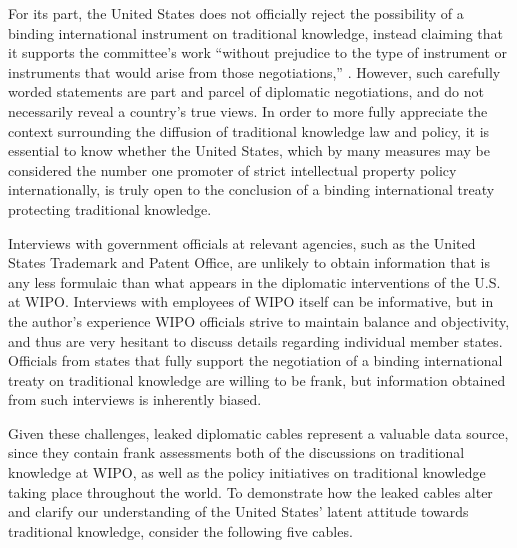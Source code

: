 \documentclass[12pt]{article}
\begin{document}
For its part, the United States does not officially reject the possibility of a binding international 
instrument on traditional knowledge, instead claiming that it supports the committee's work ``without 
prejudice to the type of instrument or instruments that would arise from those 
negotiations,'' \citep{world_intellectual_property_organization2013intergovernmental}.
However, such carefully worded statements are part and parcel of diplomatic negotiations, and 
do not necessarily reveal a country's true views.
In order to more fully appreciate the context surrounding the diffusion of traditional knowledge law 
and policy, it is essential to know whether the United States, which by many 
measures may be considered the number one promoter of strict intellectual property policy 
internationally, is truly open to the conclusion of a binding international treaty protecting 
traditional knowledge.

Interviews with government officials at relevant agencies, such as the United States Trademark and 
Patent Office, are unlikely to obtain information that is any less formulaic than what 
appears in the diplomatic interventions of the U.S. at WIPO. Interviews with employees of WIPO itself 
can be informative, but in the author's experience WIPO officials strive to maintain balance and objectivity, 
and thus are very 
hesitant to discuss details regarding individual member states. Officials from states that fully 
support the negotiation of a binding international treaty on traditional knowledge are willing to be 
frank, but information obtained from such interviews is inherently biased.

Given these challenges, leaked diplomatic cables represent a valuable 
data source, since they contain frank assessments both of the discussions on traditional 
knowledge at WIPO, as well as the policy initiatives on traditional knowledge taking place 
throughout the world. To demonstrate how the leaked cables alter and clarify our  
understanding of the United States' 
latent attitude towards traditional knowledge, consider the following five cables.
\end{document}
